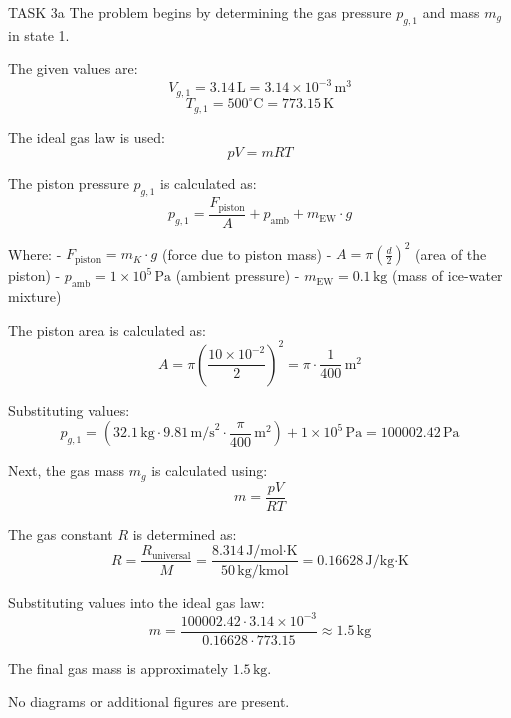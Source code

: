 TASK 3a  
The problem begins by determining the gas pressure \( p_{g,1} \) and mass \( m_g \) in state 1.  

The given values are:  
\[
V_{g,1} = 3.14 \, \text{L} = 3.14 \times 10^{-3} \, \text{m}^3
\]
\[
T_{g,1} = 500^\circ\text{C} = 773.15 \, \text{K}
\]

The ideal gas law is used:  
\[
p V = m R T
\]

The piston pressure \( p_{g,1} \) is calculated as:  
\[
p_{g,1} = \frac{F_{\text{piston}}}{A} + p_{\text{amb}} + m_{\text{EW}} \cdot g
\]

Where:  
- \( F_{\text{piston}} = m_K \cdot g \) (force due to piston mass)  
- \( A = \pi \left(\frac{d}{2}\right)^2 \) (area of the piston)  
- \( p_{\text{amb}} = 1 \times 10^5 \, \text{Pa} \) (ambient pressure)  
- \( m_{\text{EW}} = 0.1 \, \text{kg} \) (mass of ice-water mixture)  

The piston area is calculated as:  
\[
A = \pi \left(\frac{10 \times 10^{-2}}{2}\right)^2 = \pi \cdot \frac{1}{400} \, \text{m}^2
\]

Substituting values:  
\[
p_{g,1} = \left(32.1 \, \text{kg} \cdot 9.81 \, \text{m/s}^2 \cdot \frac{\pi}{400} \, \text{m}^2\right) + 1 \times 10^5 \, \text{Pa} = 100002.42 \, \text{Pa}
\]

Next, the gas mass \( m_g \) is calculated using:  
\[
m = \frac{p V}{R T}
\]

The gas constant \( R \) is determined as:  
\[
R = \frac{R_{\text{universal}}}{M} = \frac{8.314 \, \text{J/mol·K}}{50 \, \text{kg/kmol}} = 0.16628 \, \text{J/kg·K}
\]

Substituting values into the ideal gas law:  
\[
m = \frac{100002.42 \cdot 3.14 \times 10^{-3}}{0.16628 \cdot 773.15} \approx 1.5 \, \text{kg}
\]  

The final gas mass is approximately \( 1.5 \, \text{kg} \).  

No diagrams or additional figures are present.